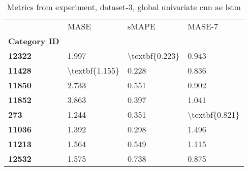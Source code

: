 \begin{table}[h]
\centering
\caption{Metrics from experiment, dataset-3, global univariate cnn ae lstm}
\label{table:global-univariate-cnn-ae-lstm-dataset-3}
\begin{tabular}{llll}
\toprule
{} &            MASE &           sMAPE &          MASE-7 \\
\textbf{Category ID} &                 &                 &                 \\
\midrule
\textbf{12322      } &           1.997 &  \textbackslash textbf\{0.223\} &           0.943 \\
\textbf{11428      } &  \textbackslash textbf\{1.155\} &           0.228 &           0.836 \\
\textbf{11850      } &           2.733 &           0.551 &           0.902 \\
\textbf{11852      } &           3.863 &           0.397 &           1.041 \\
\textbf{273        } &           1.244 &           0.351 &  \textbackslash textbf\{0.821\} \\
\textbf{11036      } &           1.392 &           0.298 &           1.496 \\
\textbf{11213      } &           1.564 &           0.549 &           1.115 \\
\textbf{12532      } &           1.575 &           0.738 &           0.875 \\
\bottomrule
\end{tabular}
\end{table}
